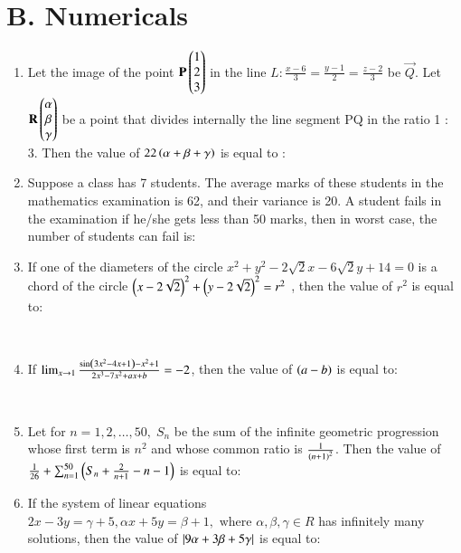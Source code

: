 \documentclass[journal]{IEEEtran}
\theoremstyle{remark}
\begin{document}
\section*{B. Numericals}
\begin{enumerate}

\item  Let the image of the point $\mathbf{P}\begin{pmatrix}1\\ 2\\ 3\end{pmatrix}$ in the line $L: \frac{x - 6}{3} = \frac{y - 1}{2} = \frac{z - 2}{3}$ be $\vec{Q}$. Let $\mathbf{R} \begin{pmatrix}\alpha \\ \beta \\ \gamma\end{pmatrix}$ be a point that divides internally the line segment PQ in the ratio 1 : 3. Then the value of $22\left(\alpha + \beta + \gamma\right)$ is equal to :\hfill{}
\\


\item Suppose a class has 7 students. The average marks of these students in the mathematics examination is 62, and their variance is 20. A student fails in the examination if he/she gets less than 50 marks, then in worst case, the number of students can fail is:\hfill{}
\\


\item If one of the diameters of the circle $x^2 + y^2 - 2\sqrt{2}x - 6\sqrt{2}y + 14 = 0$ is a chord of the circle
${\left( x - 2\sqrt{2} \right)}^2 + {\left( y - 2\sqrt{2} \right)}^2 = r^2$ , then the value of $r^2$ is equal to:

\hfill{}
\\

\item If $\lim_{x \to 1} \frac{\sin\left(3x^2 - 4x + 1\right) - x^2 + 1}{2x^3 - 7x^2 + ax + b} = -2$, then the value of $\left(a - b\right)$ is equal to:

\hfill{}
\\

\item Let for $n = 1, 2,\dots, 50, \; S_n$ be the sum of the infinite geometric progression whose first term is $n^2$ and whose common ratio is $\frac{1}{\left(n + 1\right)^2}$. Then the value of $\frac{1}{26} + \sum_{n=1}^{50} \left( S_n + \frac{2}{n + 1} - n - 1\right) $ is equal to:\hfill{}
\\


\item If the system of linear equations $2x - 3y = \gamma + 5, \alpha x + 5y = \beta + 1, \text{ where } \alpha, \beta, \gamma \in R$ has infinitely many solutions, then the value of $\left\vert9\alpha + 3\beta + 5\gamma\right\vert$ is equal to:


\end{enumerate}
\end{document}
